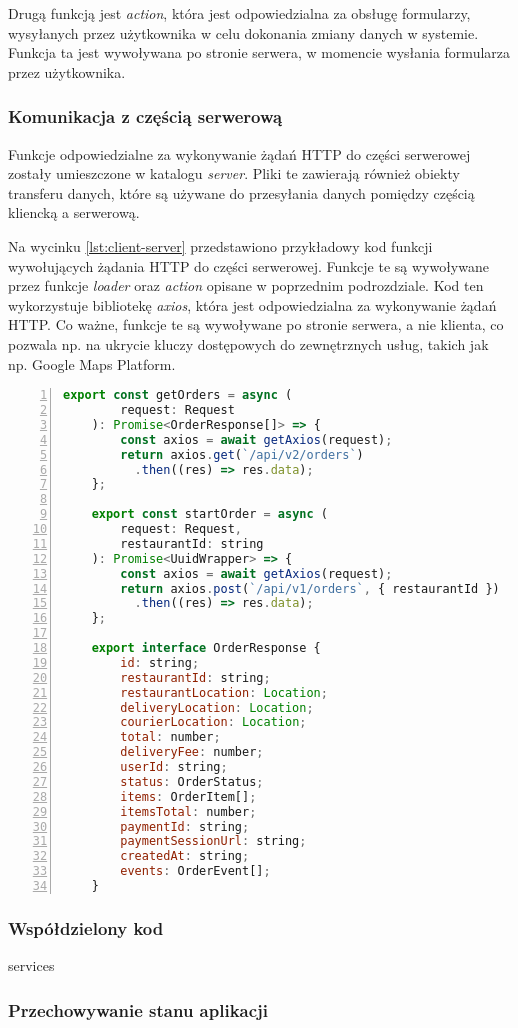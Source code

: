 Drugą funkcją jest \textit{action}, która jest odpowiedzialna za obsługę formularzy, wysyłanych przez użytkownika w celu dokonania zmiany danych w systemie. Funkcja ta jest wywoływana po stronie serwera, w momencie wysłania formularza przez użytkownika.

\subsubsection{Komunikacja z częścią serwerową}

Funkcje odpowiedzialne za wykonywanie żądań HTTP do części serwerowej zostały umieszczone w katalogu \textit{server}. Pliki te zawierają również obiekty transferu danych, które są używane do przesyłania danych pomiędzy częścią kliencką a serwerową.

Na wycinku \ref{lst:client-server} przedstawiono przykładowy kod funkcji wywołujących żądania HTTP do części serwerowej. Funkcje te są wywoływane przez funkcje \textit{loader} oraz \textit{action} opisane w poprzednim podrozdziale. Kod ten wykorzystuje bibliotekę \textit{axios}, która jest odpowiedzialna za wykonywanie żądań HTTP. Co ważne, funkcje te są wywoływane po stronie serwera, a nie klienta, co pozwala np. na ukrycie kluczy dostępowych do zewnętrznych usług, takich jak np. Google Maps Platform.

\begin{lstlisting}[caption={Kod funkcji wywołujących żadania HTTP do części serwerowej},label={lst:client-server},captionpos=b,language=JavaScript,numbers=left,showstringspaces=false]
    export const getOrders = async (
        request: Request
    ): Promise<OrderResponse[]> => {
        const axios = await getAxios(request);
        return axios.get(`/api/v2/orders`)
          .then((res) => res.data);
    };
      
    export const startOrder = async (
        request: Request,
        restaurantId: string
    ): Promise<UuidWrapper> => {
        const axios = await getAxios(request);
        return axios.post(`/api/v1/orders`, { restaurantId })
          .then((res) => res.data);
    };

    export interface OrderResponse {
        id: string;
        restaurantId: string;
        restaurantLocation: Location;
        deliveryLocation: Location;
        courierLocation: Location;
        total: number;
        deliveryFee: number;
        userId: string;
        status: OrderStatus;
        items: OrderItem[];
        itemsTotal: number;
        paymentId: string;
        paymentSessionUrl: string;
        createdAt: string;
        events: OrderEvent[];
    }
\end{lstlisting}

\subsubsection{Współdzielony kod} services

\subsubsection{Przechowywanie stanu aplikacji}